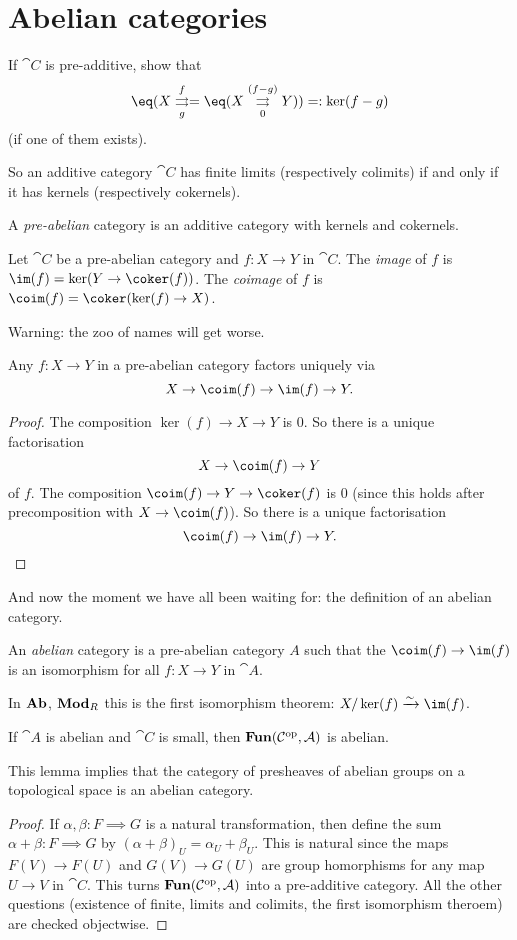 \documentclass[../main.tex]{subfiles}
\begin{document}
\section{Abelian categories}
\begin{exc}
	If $\cat C$ is pre-additive, show that \[
    	\eq(X \xrightrightarrows{f}[g] = \eq(X \xrightrightarrows{(f-g)}[0] Y)) =: \ker(f-g)
    \] (if one of them exists).
\end{exc}
So an additive category $\cat C$ has finite limits (respectively colimits) if and only if it has kernels (respectively cokernels).
\begin{defn}
	A \emph{pre-abelian} category is an additive category with kernels and cokernels.
\end{defn}
\begin{defn}
	Let $\cat C$ be a pre-abelian category and $f: X \to Y$ in $\cat C$. The \emph{image} of $f$ is $\im(f) = \ker(Y \to \coker(f))$. The \emph{coimage} of $f$ is $\coim(f) = \coker(\ker(f) \to X)$.
\end{defn}
Warning: the zoo of names will get worse.
\begin{lem}
	Any $f: X \to Y$ in a pre-abelian category factors uniquely via \[
    	X \to \coim(f) \to \im(f) \to Y.
    \]
\end{lem}
\begin{proof}
	The composition $\ker(f) \to X \to Y$ is $0$. So there is a unique factorisation \[
    	X \to \coim(f) \to Y
    \] of $f$. The composition $\coim(f) \to Y \to \coker(f)$ is $0$ (since this holds after precomposition with $X \to \coim(f)$). So there is a unique factorisation \[
    	\coim(f) \to \im(f) \to Y.
    \]
\end{proof}
And now the moment we have all been waiting for: the definition of an abelian category.

\begin{defn}
	An \emph{abelian} category is a pre-abelian category $A$ such that the $\coim(f) \to \im(f)$ is an isomorphism for all $f: X \to Y$ in $\cat A$.
\end{defn}
\begin{exmp}
	In $\mathbf{Ab}$, $\catModule_R$ this is the first isomorphism theorem: $X/\ker(f) \xrightarrow{\sim} \im(f)$.
\end{exmp}
\begin{lem}
	If $\cat A$ is abelian and $\cat C$ is small, then $\operatorname{\mathbf{Fun}}(\mathcal{C}^{\mathrm{op}}, \mathcal{A})$ is abelian.
\end{lem}
This lemma implies that the category of presheaves of abelian groups on a topological space is an abelian category.

\begin{proof}
	If $\alpha, \beta: F \implies G$ is a natural transformation, then define the sum $\alpha + \beta: F \implies G$ by $(\alpha + \beta)_U = \alpha_U + \beta_U$. This is natural since the maps $F(V) \to F(U)$ and $G(V) \to G(U)$ are group homorphisms for any map $U \to V$ in $\cat C$. This turns $\operatorname{\mathbf{Fun}}(\mathcal{C}^{\mathrm{op}}, \mathcal{A})$ into a pre-additive category. All the other questions (existence of finite, limits and colimits, the first isomorphism theroem) are checked objectwise.
\end{proof}
\end{document}
